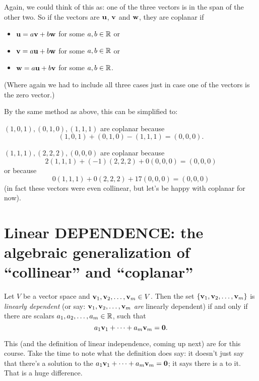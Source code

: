 Again, we could think of this as:  one of the three vectors
is in the span of the other two.  So if the vectors are
$\mathbf{u}$, $\mathbf{v}$ and $\mathbf{w}$, they are coplanar if
\begin{itemize}
\item $\mathbf{u} = a\mathbf{v}+b\mathbf{w}$ for some $a,b\in \mathbb{R}$ or
\item $\mathbf{v} = a\mathbf{u} + b\mathbf{w}$ for some  $a,b\in \mathbb{R}$ or
\item $\mathbf{w} = a\mathbf{u} + b\mathbf{v}$ for some  $a,b\in \mathbb{R}$.
\end{itemize}
(Where again we had to include all three cases just in case
one of the vectors is the zero vector.)

By the same method as above, this can be simplified to:


\begin{myexample} $(1,0,1), (0,1,0), (1,1,1)$ are coplanar because
$$
(1,0,1) + (0,1,0) - (1,1,1) = (0,0,0).
$$
\end{myexample}

\begin{myexample} $(1,1,1), (2,2,2), (0,0,0)$ are coplanar because
$$
2(1,1,1) + (-1)(2,2,2)+0(0,0,0) = (0,0,0)
$$
or because
$$
0(1,1,1) + 0(2,2,2) + 17(0,0,0) = (0,0,0)
$$
(in fact these vectors were even collinear, but let's be happy
with coplanar for now).\end{myexample}

\section[Linear DEPENDENCE]{Linear DEPENDENCE: the algebraic generalization of ``collinear'' and ``coplanar''}



\begin{definition}  Let $V$ be a vector space and
$\mathbf{v}_1, \mathbf{v}_2, \ldots, \mathbf{v}_m \in V$.  Then the set 
$\{\mathbf{v}_1, \mathbf{v}_2, \ldots, \mathbf{v}_m\}$ is \emph{linearly dependent}
(or say:  $\mathbf{v}_1, \mathbf{v}_2, \ldots, \mathbf{v}_m$ \emph{are} linearly dependent)
if and only if there are scalars $a_1, a_2, \ldots, a_m \in \mathbb{R}$,
 such that 
$$
a_1\mathbf{v}_1 + \cdots + a_m\mathbf{v}_m = \mathbf{0}.
$$
\end{definition}

This (and the definition of linear independence, coming up next) are  for this course.  Take the time to note what the definition does  say:  it doesn't just say that there's a solution to the  $a_1\mathbf{v}_1 + \cdots + a_m\mathbf{v}_m = \mathbf{0}$; it says there is a  to it.  That is a huge difference.

